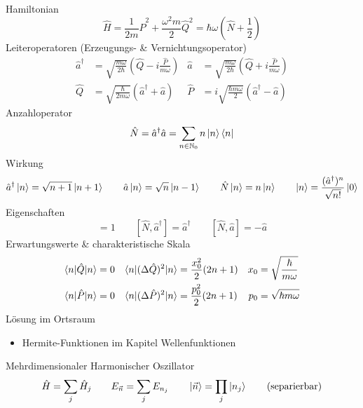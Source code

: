 Hamiltonian \cite[Glg. 4.61, 4.65]{qm}
\begin{equation*}
	\hat{H} = \frac{1}{2m}\hat{P}^2+\frac{\omega^2 m}{2}\hat{Q}^2 = \hbar\omega\left(\hat{N}+\frac{1}{2}\right)
\end{equation*}
Leiteroperatoren (Erzeugungs- \& Vernichtungsoperator) \cite[Glg. 4.62]{qm}
\begin{align*}
	\hat{a}^\dagger &= \sqrt{\frac{m\omega}{2\hbar}}\left(\hat{Q}-i\frac{\hat{P}}{m\omega}\right) & \hat{a} &= \sqrt{\frac{m\omega}{2\hbar}}\left(\hat{Q}+i\frac{\hat{P}}{m\omega}\right) \\
	\hat{Q} &= \sqrt{\frac{\hbar}{2m\omega}}\left(\hat{a}^\dagger+\hat{a}\right) & \hat{P} &= i\sqrt{\frac{\hbar m\omega}{2}}\left(\hat{a}^\dagger-\hat{a}\right)
\end{align*}
Anzahloperator \cite[Glg. 4.64, 4.75]{qm}
\begin{equation*}
	\hat{N} = \hat{a}^\dagger\hat{a} = \sum_{n\in\mathbb{N}_0} n\ket{n}\bra{n}
\end{equation*}
Wirkung \cite[Glg. 4.72, 4.73, 4.75, 4.77]{qm}
\begin{equation*}
    \hat{a}^\dagger\ket{n}=\sqrt{n+1}\ket{n+1} \qquad \hat{a}\ket{n}=\sqrt{n}\ket{n-1} \qquad \hat{N}\ket{n}=n\ket{n} \qquad \ket{n}=\frac{(\hat{a}^\dagger)^n}{\sqrt{n!}}\ket{0}
\end{equation*}
Eigenschaften \cite[Glg. 4.66, 4.67]{qm}
\begin{equation*}
    [\hat{a}, \hat{a}^\dagger] = 1 \qquad [\hat{N}, \hat{a}^\dagger] = \hat{a}^\dagger \qquad [\hat{N}, \hat{a}] = -\hat{a}
\end{equation*}
Erwartungswerte \& charakteristische Skala \cite[Glg. 4.82, nach Glg. 4.79]{qm}
\begin{align*}
	\braket{n|\hat{Q}|n} &= 0 & \braket{n|(\Delta\hat{Q})^2|n} &= \frac{x_0^2}{2}(2n+1) & x_0 &= \sqrt{\frac{\hbar}{m\omega}} \\
	\braket{n|\hat{P}|n} &= 0 & \braket{n|(\Delta\hat{P})^2|n} &= \frac{p_0^2}{2}(2n+1) & p_0 &= \sqrt{\hbar m\omega}
\end{align*}
Lösung im Ortsraum \cite[Glg. 4.86]{qm}
\begin{itemize}
    \item Hermite-Funktionen im Kapitel Wellenfunktionen
\end{itemize}
Mehrdimensionaler Harmonischer Oszillator \cite[Kap. 4.4.6]{nolting51}
\begin{equation*}
    \hat{H}=\sum_j\hat{H}_j \qquad E_{\vec{n}}=\sum_jE_{n_j} \qquad \ket{\vec{n}}=\prod_j\ket{n_j}\qquad \text{(separierbar)}
\end{equation*}


